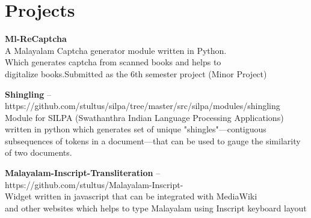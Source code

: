 \documentclass[11pt,a4paper]{moderncv}
\begin{document}



\section{Projects}

\cvlistitem
{\textbf{Ml-ReCaptcha}  
  \\A Malayalam Captcha generator module written in Python. \\
    Which generates captcha from scanned books and helps to  \\
    digitalize books.Submitted as the 6th semester project (Minor Project) \\
}

\cvlistitem
{\textbf{Shingling} -- {\small https://github.com/stultus/silpa/tree/master/src/silpa/modules/shingling}
  \\Module for SILPA (Swathanthra Indian Language Processing Applications)\\
    written in python which generates set of unique "shingles"—contiguous  \\
    subsequences of tokens in a document—that can be used to gauge the similarity of two documents.\\
}

\cvlistitem
{\textbf{Malayalam-Inscript-Transliteration} -- {\small https://github.com/stultus/Malayalam-Inscript-}
  \\Widget written in javascript that can be integrated with MediaWiki \\
    and other websites which helps to type Malayalam using Inscript keyboard layout \\
}
\end{document}
